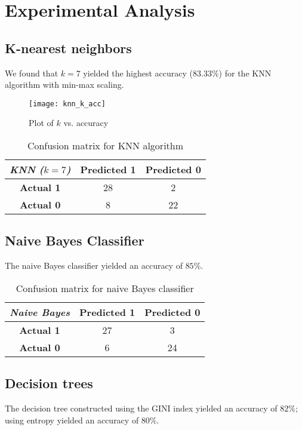 \documentclass{article}
\begin{document}
\section{Experimental Analysis}
\subsection{K-nearest neighbors}
We found that $k=7$ yielded the highest accuracy ($83.33\%$) for the KNN algorithm with min-max scaling.
\begin{figure}[h]
\texttt{[image: knn\_k\_acc]}
\centering
\caption{Plot of $k$ vs. accuracy}
\centering
\end{figure}

\begin{table}[h]
\centering
\begin{tabular}[h]{ |c|c|c| } 
 \hline
 \textit{KNN ($k=7$)} & \textbf{Predicted 1} & \textbf{Predicted 0} \\ 
\hline
 \textbf{Actual 1} & 28 & 2 \\ 
\hline
 \textbf{Actual 0} & 8 & 22 \\ 
 \hline
\end{tabular}
\caption{Confusion matrix for KNN algorithm}
\end{table}

\subsection{Naive Bayes Classifier}
The naive Bayes classifier yielded an accuracy of $85\%$. 


\begin{table}[h]
\centering
\begin{tabular}[h]{ |c|c|c| } 
 \hline
 \textit{Naive Bayes} & \textbf{Predicted 1} & \textbf{Predicted 0} \\ 
\hline
 \textbf{Actual 1} & 27 & 3 \\ 
\hline
 \textbf{Actual 0} & 6 & 24 \\ 
 \hline
\end{tabular}
\caption{Confusion matrix for naive Bayes classifier}
\end{table}


\subsection{Decision trees}
The decision tree constructed using the GINI index yielded an accuracy of $82\%$; using entropy yielded an accuracy of $80\%$.
\end{document}
